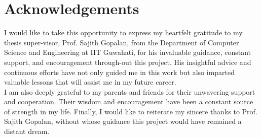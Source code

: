 \chapter*{\centering Acknowledgements}
\quad I would like to take this opportunity to express my heartfelt gratitude to my thesis super-visor, Prof. Sajith Gopalan, from the Department of Computer Science and Engineering at IIT Guwahati, for his invaluable guidance, constant support, and encouragement through-out this project. His insightful advice and continuous efforts have not only guided me in this work but also imparted valuable lessons that will assist me in my future career.\\ 

I am also deeply grateful to my parents and friends for their unwavering support and cooperation. Their wisdom and encouragement have been a constant source of strength in my life. Finally, I would like to reiterate my sincere thanks to Prof. Sajith Gopalan, without whose guidance this project would have remained a distant dream. 
